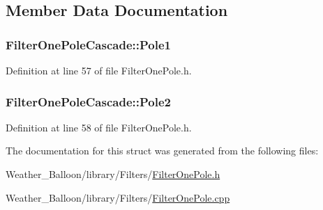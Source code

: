 \subsection{Member Data Documentation}
\subsubsection[{\texorpdfstring{Pole1}{Pole1}}]{ Filter\+One\+Pole\+Cascade\+::\+Pole1}\hypertarget{struct_filter_one_pole_cascade_aac9323487315e0d835dd5dfd3e4aed01}{}\label{struct_filter_one_pole_cascade_aac9323487315e0d835dd5dfd3e4aed01}


Definition at line 57 of file Filter\+One\+Pole.\+h.

\subsubsection[{\texorpdfstring{Pole2}{Pole2}}]{ Filter\+One\+Pole\+Cascade\+::\+Pole2}\hypertarget{struct_filter_one_pole_cascade_ab12f11d5af6dc6736e3766a16473220a}{}\label{struct_filter_one_pole_cascade_ab12f11d5af6dc6736e3766a16473220a}


Definition at line 58 of file Filter\+One\+Pole.\+h.



The documentation for this struct was generated from the following files\+:\begin{DoxyCompactItemize}
\item 
Weather\+\_\+\+Balloon/library/\+Filters/\hyperlink{_filter_one_pole_8h}{Filter\+One\+Pole.\+h}\item 
Weather\+\_\+\+Balloon/library/\+Filters/\hyperlink{_filter_one_pole_8cpp}{Filter\+One\+Pole.\+cpp}\end{DoxyCompactItemize}
